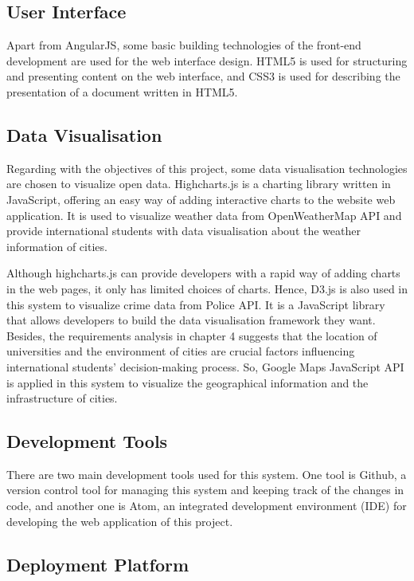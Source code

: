 \subsection{User Interface}

Apart from AngularJS, some basic building technologies of the front-end development are used for the web interface design. HTML5 is used for structuring and presenting content on the web interface, and CSS3 is used for describing the presentation of a document written in HTML5.
 
\subsection{Data Visualisation}

Regarding with the objectives of this project, some data visualisation technologies are chosen to visualize open data. Highcharts.js is a charting library written in JavaScript, offering an easy way of adding interactive charts to the website web application. It is used to visualize weather data from OpenWeatherMap API and provide international students with data visualisation about the weather information of cities. 

Although highcharts.js can provide developers with a rapid way of adding charts in the web pages, it only has limited choices of charts. Hence, D3.js is also used in this system to visualize crime data from Police API. It is a JavaScript library that allows developers to build the data visualisation framework they want. Besides, the requirements analysis in chapter 4 suggests that the location of universities and the environment of cities are crucial factors influencing international students’ decision-making process. So, Google Maps JavaScript API is applied in this system to visualize the geographical information and the infrastructure of cities.


\subsection{Development Tools}

There are two main development tools used for this system. One tool is Github, a version control tool for managing this system and keeping track of the changes in code, and another one is Atom, an integrated development environment (IDE) for developing the web application of this project.

\subsection{Deployment Platform}

